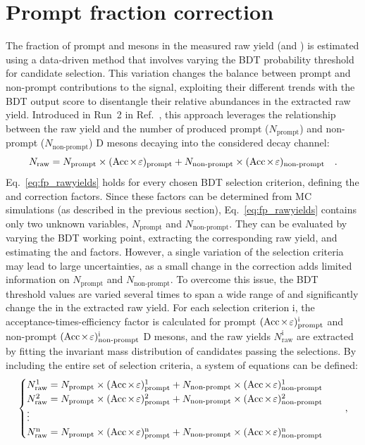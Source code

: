 \section{Prompt fraction correction}\label{sec:fp}
The fraction of prompt \ds and \dpl mesons in the measured raw yield (\fpds and \fpdpl) is estimated using a data-driven method that involves varying the BDT probability threshold for candidate selection. This variation changes the balance between prompt and non-prompt contributions to the signal, exploiting their different trends with the BDT output score to disentangle their relative abundances in the extracted raw yield. Introduced in Run~2 in Ref.~\cite{ALICE:2021mgk}, this approach leverages the relationship between the raw yield and the number of produced prompt ($N_\mathrm{prompt}$) and non-prompt ($N_\mathrm{non\text{-}prompt}$) D mesons decaying into the considered decay channel:
\begin{equation}\label{eq:fp_rawyields}
    N_\mathrm{raw} = N_\mathrm{prompt}\times(\mathrm{Acc}\mkern-2mu\times\mkern-2mu\varepsilon)_\mathrm{prompt} + N_\mathrm{non\text{-}prompt} \times (\mathrm{Acc}\mkern-2mu\times\mkern-2mu\varepsilon)_\mathrm{non\text{-}prompt}\quad .
\end{equation}
\vspace{0.1cm}
Eq.~\ref{eq:fp_rawyields} holds for every chosen BDT selection criterion, defining the \aeffp and \aeffnp correction factors. Since these factors can be determined from MC simulations (as described in the previous section), Eq.~\ref{eq:fp_rawyields} contains only two unknown variables, $N_\mathrm{prompt}$ and $N_\mathrm{non\text{-}prompt}$. They can be evaluated by varying the BDT working point, extracting the corresponding raw yield, and estimating the \aeffp and \aeffnp factors. However, a single variation of the selection criteria may lead to large uncertainties, as a small change in the \aeff correction adds limited information on $N_\mathrm{prompt}$ and $N_\mathrm{non\text{-}prompt}$. To overcome this issue, the BDT threshold values are varied several times to span a wide range of \aeffp and significantly change the \fp in the extracted raw yield. For each selection criterion i, the acceptance-times-efficiency factor is calculated for prompt $(\mathrm{Acc}\mkern-2mu\times\mkern-2mu\varepsilon)_\mathrm{prompt}^\mathrm{i}$ and non-prompt $(\mathrm{Acc}\mkern-2mu\times\mkern-2mu\varepsilon)_\mathrm{non\text{-}prompt}^\mathrm{i}$ D mesons, and the raw yields $N_\mathrm{raw}^\mathrm{i}$ are extracted by fitting the invariant mass distribution of candidates passing the selections. By including the entire set of selection criteria, a system of equations can be defined:
\begin{equation*}
    \begin{cases}
        N_\mathrm{raw}^1 = N_\mathrm{prompt}\times(\mathrm{Acc}\mkern-2mu\times\mkern-2mu\varepsilon)_\mathrm{prompt}^1 + N_\mathrm{non\text{-}prompt} \times (\mathrm{Acc}\mkern-2mu\times\mkern-2mu\varepsilon)_\mathrm{non\text{-}prompt}^1\\
        N_\mathrm{raw}^2 = N_\mathrm{prompt}\times(\mathrm{Acc}\mkern-2mu\times\mkern-2mu\varepsilon)_\mathrm{prompt}^2 + N_\mathrm{non\text{-}prompt} \times (\mathrm{Acc}\mkern-2mu\times\mkern-2mu\varepsilon)_\mathrm{non\text{-}prompt}^2\\
        \vdots\\
        N_\mathrm{raw}^\mathrm{n} = N_\mathrm{prompt}\times(\mathrm{Acc}\mkern-2mu\times\mkern-2mu\varepsilon)_\mathrm{prompt}^\mathrm{n} + N_\mathrm{non\text{-}prompt} \times (\mathrm{Acc}\mkern-2mu\times\mkern-2mu\varepsilon)_\mathrm{non\text{-}prompt}^\mathrm{n}
    \end{cases}
    \quad ,
\end{equation*}
